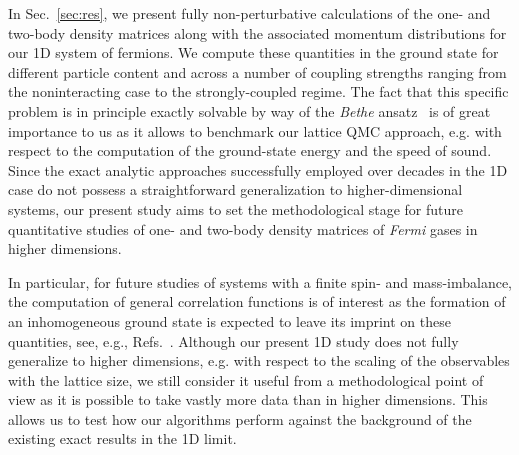 \documentclass[pra,aps,groupedaddress,floatfix,twocolumn,superscriptaddress,showpacs,nofootinbib]{revtex4-1}
\begin{document}
{In Sec.~\ref{sec:res}, we present fully non-perturbative calculations of the
one- and two-body density matrices along with the associated momentum distributions for our 1D system of
fermions.
We compute these
quantities in the ground state for different particle content and across a number of coupling strengths ranging from the
noninteracting case to the strongly-coupled regime.
The fact that this specific problem is in principle exactly solvable by way of
the {\it Bethe} ansatz~\cite{betheAnsatz} is of great importance to us as
it allows to benchmark our lattice QMC approach, e.g. with respect to the computation of
the ground-state energy and the speed of sound.
Since the exact analytic approaches successfully employed over decades in the 1D case
do not possess a straightforward generalization to higher-dimensional systems,
our present study aims to set the methodological stage for future
quantitative studies of one- and two-body density matrices
of {\it Fermi} gases in higher dimensions. {In particular, for future studies of systems with a finite spin- and mass-imbalance,
the computation of general correlation functions is of interest as the formation of an
inhomogeneous ground state is expected to leave its imprint on these quantities, see, e.g., Refs.~\cite{PhysRevA.78.033607,Lee:2011zzo,Roscher:2016chy}.
Although our present 1D study does not fully generalize to higher dimensions, e.g. with respect to the scaling of the observables with the lattice size, we still consider it useful from a methodological point of view as it is possible to take vastly more data than in higher dimensions. This allows us to test how our algorithms perform
against the background of the existing exact results in the 1D limit.

}}
\end{document}
